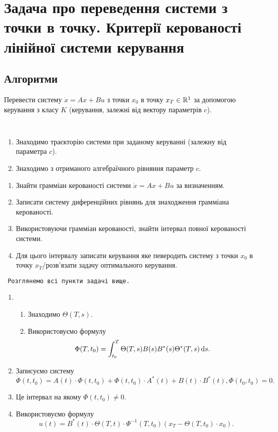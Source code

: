 
\section{Задача про переведення системи з точки в точку. Критерії керованості лінійної системи керування}

\subsection{Алгоритми}

\begin{problem*}
	Перевести систему $\dot x = A x + B u$ з точки $x_0$ в точку $x_T \in \mathbb{R}^1$ за допомогою керування з класу $K$ (керування, залежні від вектору параметрів $c$).
\end{problem*}

\begin{algorithm} \tt
	\begin{enumerate}
		\item Знаходимо траєкторію системи при заданому керуванні (залежну від параметра $c$). 
		\item Знаходимо з отриманого алгебраїчного рівняння параметр $c$.
	\end{enumerate}
\end{algorithm}

\begin{problem*}
	\begin{enumerate}
		\item Знайти грамміан керованості системи $\dot x = A x + B u$ за визначенням.
		\item Записати систему диференційних рівнянь для знаходження грамміана керованості.
		\item Використовуючи грамміан керованості, знайти інтервал повної керованості системи.
		\item Для цього інтервалу записати керування яке певеродить систему з точки $x_0$ в точку $x_T$/розв'язати задачу оптимального керування.
	\end{enumerate}
\end{problem*}

\begin{algorithm} \tt
	Розглянемо всі пункти задачі вище.
	\begin{enumerate}
		\item \begin{enumerate}
			\item Знаходимо $\Theta(T,s)$.
			\item Використовуємо формулу \[\Phi(T, t_0) = \int_{t_0}^T \Theta(T, s) B(s) B^*(s) \Theta^*(T, s) \mathop{}\!\mathrm{d} s.\]
		\end{enumerate}
		\item Записуємо систему \[ \dot \Phi(t, t_0) = A(t) \cdot \Phi(t,t_0)+\Phi(t,t_0)\cdot A^*(t)+B(t)\cdot B^*(t), \Phi(t_0,t_0) = 0. \]
		\item Це інтервал на якому $\Phi(t,t_0) \ne 0$.
		\item Використовуємо формулу \[ u (t) = B^*(t) \cdot \Theta(T,t)\cdot\Phi^{-1}(T,t_0)(x_T-\Theta(T,t_0)\cdot x_0). \]
	\end{enumerate}
\end{algorithm}

